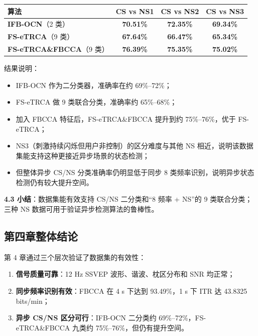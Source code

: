 \documentclass[12pt, a4paper]{ctexart}
\begin{document}
\begin{table}[h]
\centering\small
\begin{tabular}{lccc}
\toprule
\textbf{算法} & \textbf{CS vs NS1} & \textbf{CS vs NS2} & \textbf{CS vs NS3} \\
\midrule
\textbf{IFB-OCN}（2 类） & \textbf{70.51\%} & \textbf{72.35\%} & \textbf{69.34\%} \\
\textbf{FS-eTRCA}（9 类） & \textbf{67.64\%} & \textbf{66.47\%} & \textbf{65.34\%} \\
\textbf{FS-eTRCA\&FBCCA}（9 类） & \textbf{76.39\%} & \textbf{75.35\%} & \textbf{75.02\%} \\
\bottomrule
\end{tabular}
\end{table}

结果说明：

\begin{itemize}
  \item IFB-OCN 作为二分类器，准确率在约 69\%--72\%；
  \item FS-eTRCA 做 9 类联合分类，准确率约 65\%--68\%；
  \item 加入 FBCCA 特征后，FS-eTRCA\&FBCCA 提升到约 75\%--76\%，优于 FS-eTRCA；
  \item NS3（刺激持续闪烁但用户非控制）的区分难度与其他 NS 相近，说明该数据集能支持这种更接近异步场景的状态检测；
  \item 但整体异步 CS/NS 分类准确率仍明显低于同步 8 类频率识别，说明异步状态检测仍有较大提升空间。
\end{itemize}

\textbf{4.3 小结}：数据集能有效支持 CS/NS 二分类和``8 频率 + NS''的 9 类联合分类；三种 NS 数据可用于验证异步检测算法的鲁棒性。

\subsection{第四章整体结论}

第 4 章通过三个层次验证了数据集的有效性：

\begin{enumerate}
  \item \textbf{信号质量可靠}：12 Hz SSVEP 波形、谐波、枕区分布和 SNR 均正常；
  \item \textbf{同步频率识别有效}：FBCCA 在 4 s 下达到 93.49\%，1 s 下 ITR 达 43.8325 bits/min；
  \item \textbf{异步 CS/NS 区分可行}：IFB-OCN 二分类约 69\%--72\%，FS-eTRCA\&FBCCA 九类约 75\%--76\%，但仍有提升空间。
\end{enumerate}
\end{document}
